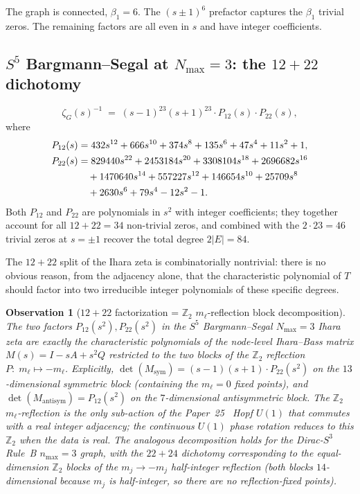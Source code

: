 \documentclass[11pt]{article}
\newtheorem{observation}{Observation}
\begin{document}
The graph is connected, $\beta_1=6$.  The $(s\pm 1)^6$ prefactor
captures the $\beta_1$ trivial zeros.  The remaining factors are all
even in $s$ and have integer coefficients.

\subsection{$S^5$ Bargmann--Segal at $N_{\max}=3$: the $12+22$
dichotomy}

\begin{equation}
\zeta_G(s)^{-1} \;=\; (s-1)^{23}(s+1)^{23}\cdot P_{12}(s) \cdot P_{22}(s),
\label{eq:s5_nmax3_closed}
\end{equation}
where
\begin{align}
P_{12}(s) &= 432 s^{12} + 666 s^{10} + 374 s^8 + 135 s^6 + 47 s^4 + 11 s^2 + 1, \\
P_{22}(s) &= 829440 s^{22} + 2453184 s^{20} + 3308104 s^{18} + 2696682 s^{16} \notag \\
           &\quad + 1470640 s^{14} + 557227 s^{12} + 146654 s^{10} + 25709 s^8 \notag \\
           &\quad + 2630 s^6 + 79 s^4 - 12 s^2 - 1.
\end{align}
Both $P_{12}$ and $P_{22}$ are polynomials in $s^2$ with integer
coefficients; they together account for all $12+22=34$ non-trivial
zeros, and combined with the $2\cdot 23 = 46$ trivial zeros at $s=\pm 1$
recover the total degree $2|E|=84$.

The $12+22$ split of the Ihara zeta is combinatorially nontrivial:
there is no obvious reason, from the adjacency alone, that the
characteristic polynomial of $T$ should factor into two irreducible
integer polynomials of these specific degrees.

\begin{observation}[$12+22$ factorization = $\mathbb{Z}_2$
$m_\ell$-reflection block decomposition]
\label{obs:12_22}
The two factors $P_{12}(s^2), P_{22}(s^2)$ in the $S^5$
Bargmann--Segal $N_{\max}=3$ Ihara zeta are exactly the characteristic
polynomials of the node-level Ihara--Bass matrix
$M(s) = I - sA + s^2 Q$ restricted to the two blocks of the
$\mathbb{Z}_2$ reflection $P:\; m_\ell\mapsto -m_\ell$.
Explicitly, $\det(M_{\text{sym}}) = (s-1)(s+1)\cdot P_{22}(s^2)$ on the
$13$-dimensional symmetric block (containing the $m_\ell=0$ fixed
points), and $\det(M_{\text{antisym}}) = P_{12}(s^2)$ on the
$7$-dimensional antisymmetric block.  The $\mathbb{Z}_2$ $m_\ell$-reflection
is the only sub-action of the Paper~25~\cite{paper25} Hopf $U(1)$ that
commutes with a real integer adjacency; the continuous $U(1)$ phase
rotation reduces to this $\mathbb{Z}_2$ when the data is real.
The analogous decomposition holds for the Dirac-$S^3$ Rule~B
$n_{\max}=3$ graph, with the $22+24$ dichotomy corresponding to the
equal-dimension $\mathbb{Z}_2$ blocks of the $m_j\to-m_j$
half-integer reflection (both blocks $14$-dimensional because $m_j$
is half-integer, so there are no reflection-fixed points).
\end{observation}
\end{document}
